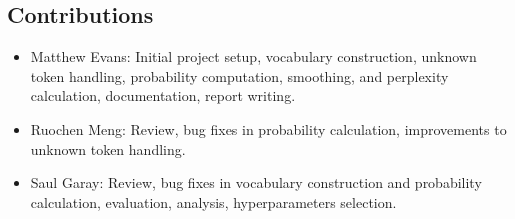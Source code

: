 \documentclass[a4paper]{article}
\begin{document}
\subsection{Contributions}
\begin{itemize}
  \item Matthew Evans: Initial project setup, vocabulary construction, unknown token handling, probability computation, smoothing, and perplexity calculation, documentation, report writing.
  \item Ruochen Meng: Review, bug fixes in probability calculation, improvements to unknown token handling.
  \item Saul Garay: Review, bug fixes in vocabulary construction and probability calculation, evaluation, analysis, hyperparameters selection.
\end{itemize}
\end{document}
